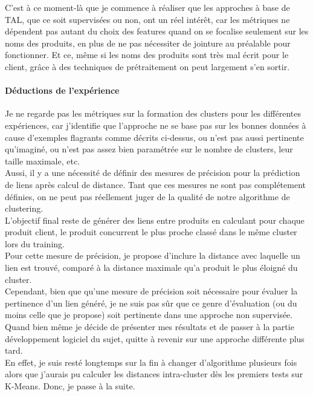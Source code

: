 \documentclass{rapportCS}
\begin{document}
C'est à ce moment-là que je commence à réaliser que les approches à base de TAL,
que ce soit supervisées ou non, ont un réel intérêt,
car les métriques ne dépendent pas autant du choix des features quand on se focalise seulement
sur les noms des produits, en plus de ne pas nécessiter de jointure au préalable pour fonctionner.
Et ce, même si les noms des produits sont très mal écrit pour le client, grâce à des techniques 
de prétraitement \cite{xgboost} on peut largement s'en sortir.\\

\paragraph{Déductions de l'expérience}
Je ne regarde pas les métriques sur la formation des clusters pour les différentes expériences, car
j'identifie que l'approche ne se base pas sur les bonnes données à cause d'exemples flagrants comme 
décrits ci-dessus, ou n'est pas aussi pertinente qu'imaginé, ou n'est pas assez bien 
paramétrée sur le nombre de clusters, leur taille maximale, etc.\\

Aussi, il y a une nécessité de définir des mesures de précision pour la prédiction de liens après
calcul de distance. Tant que ces mesures ne sont pas complétement définies, on ne peut pas
réellement juger de la qualité de notre algorithme de clustering.\\
L'objectif final reste de générer des liens entre produits en calculant pour chaque produit client, 
le produit concurrent le plus proche classé dans le même cluster lors du training.\\
Pour cette mesure de précision, je propose d'inclure la distance avec laquelle un lien est trouvé,
comparé à la distance maximale qu'a produit le plus éloigné du cluster.\\

Cependant, bien que qu'une mesure de précision soit nécessaire pour évaluer la pertinence d'un lien généré,
je ne suis pas sûr que ce genre d'évaluation (ou du moins celle que je propose)
soit pertinente dans une approche non supervisée.\\

Quand bien même je décide de présenter mes résultats et de passer à la partie développement logiciel du 
sujet, quitte à revenir sur une approche différente plus tard.\\
En effet, je suis resté longtemps sur la fin à changer d'algorithme plusieurs fois alors
que j'aurais pu calculer les distances intra-cluster dès les premiers tests sur K-Means.
Donc, je passe à la suite.
\end{document}
